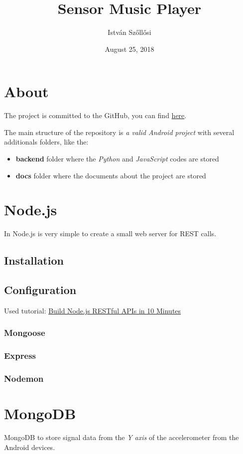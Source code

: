 \documentclass[12pt, a4paper, portrait]{article}
\title{\textbf{Sensor Music Player}}
\author{István Szőllősi}
\affil{Faculty of Sciences and Letters, ``Petru Maior'' University of Târgu Mureș}
\date{August 25, 2018}
\begin{document}
\maketitle
\newpage

\tableofcontents
\newpage

\section{About}
The project is committed to the GitHub, you can find \href{https://github.com/I-sty/SensorMusicPlayer/}{here}.
\par The main structure of the repository is
\textit{a valid Android project} with several additionals folders, like the:
\begin{itemize}
\item{\textbf{backend}} folder where the \textit{Python} and \textit{JavaScript} codes are stored
\item{\textbf{docs}} folder where the documents about the project are stored
\end{itemize}

\pagebreak
\section{Node.js}
In Node.js is very simple to create a small web server for REST calls.
\subsection{Installation}
\subsection{Configuration}
Used tutorial: \href{https://www.codementor.io/olatundegaruba/nodejs-restful-apis-in-10-minutes-q0sgsfhbd}{Build Node.js RESTful APIs in 10 Minutes}
\subsubsection{Mongoose}
\subsubsection{Express}
\subsubsection{Nodemon}

\pagebreak
\section{MongoDB}
MongoDB to store signal data from the \textit{Y axis} of the accelerometer from the Android devices.
\end{document}
